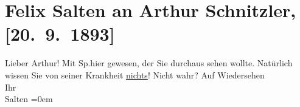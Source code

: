 

         
         \renewcommand{\erwaehntePersonen}{Personen: Felix Salten, Richard Specht}
         \renewcommand{\erwaehnteOrte}{Orte: Wien}
         \renewcommand{\erwaehnteWerke}{}
               \section[Felix Salten an Arthur Schnitzler, {[}20. 9. 1893{]}]{ Felix Salten an Arthur Schnitzler, {[}20. 9. 1893{]}}\nopagebreak{}\rehead{ }\begin{ledgroupsized}[t]{13cm}\normalsize\beginnumbering \toendnotes[C]{\smallbreak\pagebreak[2]} 
\pstart
           \noindent{}{\pb}Lieber Arthur! Mit Sp.hier gewesen, der Sie durchaus sehen wollte.
               Natürlich wissen Sie von seiner Krankheit
               { }\uline{nichts}! Nicht wahr?\pend
           \pstart
           Auf Wiedersehen {\\[\baselineskip]}Ihr {\\[\baselineskip]}\spacefill\mbox{Salten}\pend
           \leftskip=0em{}
         
         \endnumbering{}\end{ledgroupsized}  \newcommand{\dateiname}{L03129}\newcommand{\titel}{Felix Salten an Arthur Schnitzler, [20. 9. 1893]}\newcommand{\editorInnen}{Martin Anton Müller und Laura Untner}
      